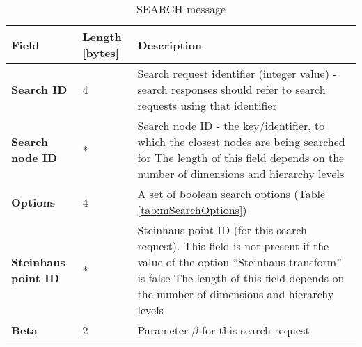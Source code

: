 \begin{table}[H]
\scriptsize
\begin{center}
\begin{tabular}{p{3cm} p{2cm} p{9.5cm}}
	\hline
	\textbf{Field}						& \textbf{Length} [bytes]				& \textbf{Description}				\\[1mm]
    \hline
    \textbf{Search ID}					& 4										& Search request identifier (integer value) - search responses should refer to search requests using that identifier					\\[1.5mm]
	\textbf{Search node ID}				& *										& Search node ID - the key/identifier, to which the closest nodes are being searched for \newline * The length of this field depends on the number of dimensions and hierarchy levels					\\[1.5mm]
	\textbf{Options}					& 4										& A set of boolean search options (Table \ref{tab:mSearchOptions})				\\[1.5mm]
	\textbf{Steinhaus point ID} \newline [optional]		& *						& Steinhaus point ID (for this search request). This field is not present if the value of the option ``Steinhaus transform'' is false \newline * The length of this field depends on the number of dimensions and hierarchy levels					\\[1.5mm]	
	\textbf{Beta}						& 2										& Parameter $\beta$ for this search request				\\[1.5mm]
    \hline
\end{tabular}
\end{center}
\caption{SEARCH message}
\label{tab:mSearch}
\end{table}

